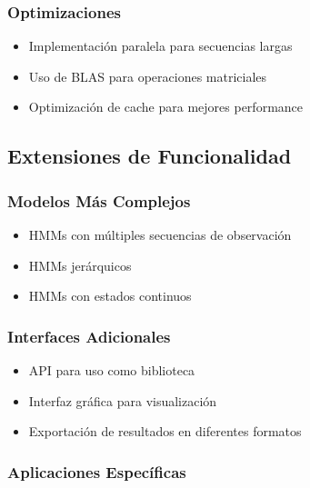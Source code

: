 \documentclass[
]{article}
\providecommand{\tightlist}{%
  \setlength{\itemsep}{0pt}\setlength{\parskip}{0pt}}
\begin{document}
\subsubsection{Optimizaciones}\label{optimizaciones}

\begin{itemize}
\tightlist
\item
  Implementación paralela para secuencias largas
\item
  Uso de BLAS para operaciones matriciales
\item
  Optimización de cache para mejores performance
\end{itemize}

\subsection{Extensiones de
Funcionalidad}\label{extensiones-de-funcionalidad}

\subsubsection{Modelos Más Complejos}\label{modelos-muxe1s-complejos}

\begin{itemize}
\tightlist
\item
  HMMs con múltiples secuencias de observación
\item
  HMMs jerárquicos
\item
  HMMs con estados continuos
\end{itemize}

\subsubsection{Interfaces Adicionales}\label{interfaces-adicionales}

\begin{itemize}
\tightlist
\item
  API para uso como biblioteca
\item
  Interfaz gráfica para visualización
\item
  Exportación de resultados en diferentes formatos
\end{itemize}

\subsubsection{Aplicaciones
Específicas}\label{aplicaciones-especuxedficas}
\end{document}
